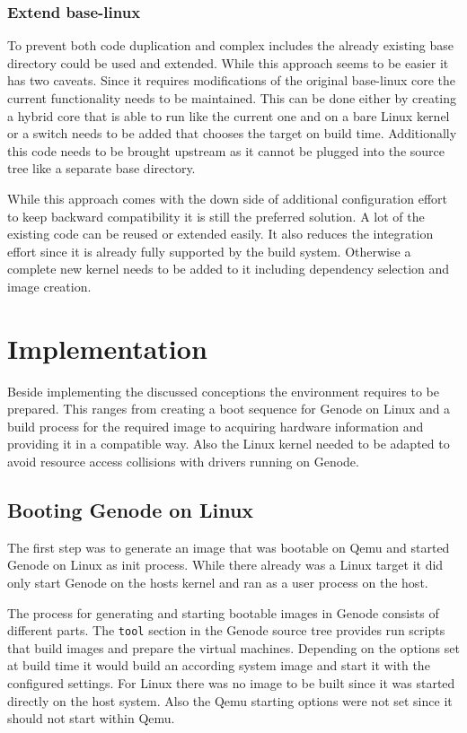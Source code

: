 \documentclass[
a4paper,
12pt,
notitlepage,
parskip=half,
DIV=11,
]{scrbook}
\begin{document}
		\subsection{Extend base-linux}
		To prevent both code duplication and complex includes the already existing base directory could be used and extended.
		While this approach seems to be easier it has two caveats.
		Since it requires modifications of the original base-linux core the current functionality needs to be maintained.
		This can be done either by creating a hybrid core that is able to run like the current one and on a bare Linux kernel or a switch needs to be added that chooses the target on build time.
		Additionally this code needs to be brought upstream as it cannot be plugged into the source tree like a separate base directory.
		
		While this approach comes with the down side of additional configuration effort to keep backward compatibility it is still the preferred solution.
		A lot of the existing code can be reused or extended easily.
		It also reduces the integration effort since it is already fully supported by the build system.
		Otherwise a complete new kernel needs to be added to it including dependency selection and image creation.
		
	
	\chapter{Implementation}
		
		Beside implementing the discussed conceptions the environment requires to be prepared.
		This ranges from creating a boot sequence for Genode on Linux and a build process for the required image to acquiring hardware information and providing it in a compatible way.
		Also the Linux kernel needed to be adapted to avoid resource access collisions with drivers running on Genode.
		
		\section{Booting Genode on Linux}
		\label{init}
		
		The first step was to generate an image that was bootable on Qemu and started Genode on Linux as init process.
		While there already was a Linux target it did only start Genode on the hosts kernel and ran as a user process on the host.
		
		The process for generating and starting bootable images in Genode consists of different parts.
		The \texttt{tool} section in the Genode source tree provides run scripts that build images and prepare the virtual machines.
		Depending on the options set at build time it would build an according system image and start it with the configured settings.
		For Linux there was no image to be built since it was started directly on the host system.
		Also the Qemu starting options were not set since it should not start within Qemu. \citep{genode}
		
\end{document}
